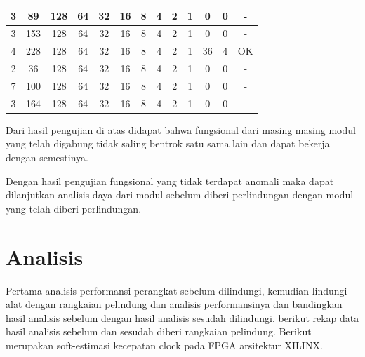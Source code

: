 \begin{table}[H]
\begin{tabular}{|c|c|c|c|c|c|c|c|c|c|c|c|c|}
		\hline
		3     & 89    & 128   & 64    & 32    & 16    & 8     & 4     & 2     & 1     & 0     & 0     & - \bigstrut\\
		\hline
		3     & 153   & 128   & 64    & 32    & 16    & 8     & 4     & 2     & 1     & 0     & 0     & - \bigstrut\\
		\hline
		4     & 228   & 128   & 64    & 32    & 16    & 8     & 4     & 2     & 1     & 36    & 4     & OK \bigstrut\\
		\hline
		2     & 36    & 128   & 64    & 32    & 16    & 8     & 4     & 2     & 1     & 0     & 0     & - \bigstrut\\
		\hline
		7     & 100   & 128   & 64    & 32    & 16    & 8     & 4     & 2     & 1     & 0     & 0     & - \bigstrut\\
		\hline
		3     & 164   & 128   & 64    & 32    & 16    & 8     & 4     & 2     & 1     & 0     & 0     & - \bigstrut\\
		\hline
	\end{tabular}%
\end{table}%

Dari hasil pengujian di atas didapat bahwa fungsional dari masing masing modul yang telah digabung tidak saling bentrok satu sama lain dan dapat bekerja dengan semestinya.

Dengan hasil pengujian fungsional yang tidak terdapat anomali maka dapat dilanjutkan analisis daya dari modul sebelum diberi perlindungan dengan modul yang telah diberi perlindungan.

% 

\section{Analisis}
Pertama analisis performansi perangkat sebelum dilindungi, kemudian lindungi alat dengan rangkaian pelindung dan analisis performansinya dan bandingkan hasil analisis sebelum dengan hasil analisis sesudah dilindungi. berikut rekap data hasil analisis sebelum dan sesudah diberi rangkaian pelindung. Berikut merupakan soft-estimasi kecepatan clock pada FPGA arsitektur XILINX.


